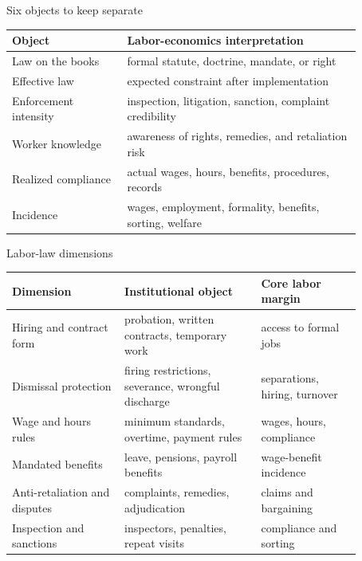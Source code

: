 \documentclass[aspectratio=169,11pt]{beamer}
\begin{document}
\begin{frame}{Six objects to keep separate}
\small
\begin{tabular}{p{0.29\linewidth} p{0.58\linewidth}}
\toprule
Object & Labor-economics interpretation \\
\midrule
Law on the books & formal statute, doctrine, mandate, or right \\
Effective law & expected constraint after implementation \\
Enforcement intensity & inspection, litigation, sanction, complaint credibility \\
Worker knowledge & awareness of rights, remedies, and retaliation risk \\
Realized compliance & actual wages, hours, benefits, procedures, records \\
Incidence & wages, employment, formality, benefits, sorting, welfare \\
\bottomrule
\end{tabular}
\end{frame}

\begin{frame}{Labor-law dimensions}
\small
\begin{tabular}{p{0.28\linewidth} p{0.34\linewidth} p{0.25\linewidth}}
\toprule
Dimension & Institutional object & Core labor margin \\
\midrule
Hiring and contract form & probation, written contracts, temporary work & access to formal jobs \\
Dismissal protection & firing restrictions, severance, wrongful discharge & separations, hiring, turnover \\
Wage and hours rules & minimum standards, overtime, payment rules & wages, hours, compliance \\
Mandated benefits & leave, pensions, payroll benefits & wage-benefit incidence \\
Anti-retaliation and disputes & complaints, remedies, adjudication & claims and bargaining \\
Inspection and sanctions & inspectors, penalties, repeat visits & compliance and sorting \\
\bottomrule
\end{tabular}
\end{frame}
\end{document}
